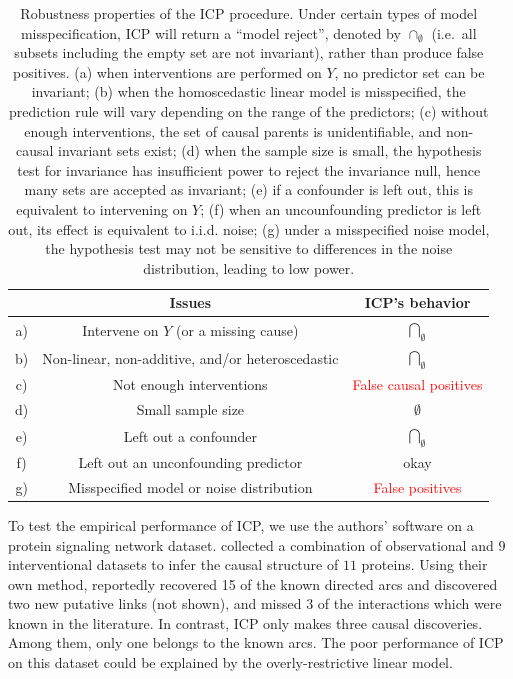 \documentclass{article}
\begin{document}
\begin{table}[h]
\centering
  \begin{tabular}{c|c|c|}
    \hline
    &\textbf{Issues} & \textbf{ICP's behavior} \\
    \hline
    a) & Intervene on $Y$ (or a missing cause) &
    $\underset{\emptyset}{\bigcap}$ \\
    \hline
    b) & Non-linear, non-additive, and/or heteroscedastic &
    $\underset{\emptyset}{\bigcap}$ \\
    \hline
    c) & Not enough interventions &
    \textcolor{red}{False causal positives} \\
    \hline
    d) & Small sample size &
    $\emptyset$ \\
    \hline
    e) & Left out a confounder & $\underset{\emptyset}{\bigcap}$ \\
    \hline
    f) & Left out an unconfounding predictor & okay  \\
    \hline
    g) & Misspecified model or noise distribution & \textcolor{red}{False positives}\\\hline
  \end{tabular}
\caption{\small Robustness properties of the ICP procedure.  Under certain types
  of model misspecification, ICP will return a ``model reject'',
  denoted by $\cap_{\emptyset}$ (i.e.\ all subsets including the empty
  set are not invariant), rather than produce false positives.
(a) when interventions are performed on $Y$, no predictor set can be invariant;
(b) when the homoscedastic linear model is misspecified, the prediction rule
will vary depending on the range of the predictors; (c) without enough interventions,
the set of causal parents is unidentifiable, and non-causal invariant sets exist;
(d) when the sample size is small, the hypothesis test for invariance has insufficient power to reject the invariance null,
hence many sets are accepted as invariant;
(e) if a confounder is left out, this is equivalent to intervening on $Y$;
(f) when an uncounfounding predictor is left out, its effect is equivalent to i.i.d. noise;
(g) under a misspecified noise model, the hypothesis test may not be sensitive to differences in the noise distribution,
leading to low power.
}
\label{tab:icp}
\end{table}

To test the empirical performance of ICP, we use the authors' software
on a protein signaling network dataset. \citet{sachs2005causal}
collected a combination of observational and $9$ interventional datasets to
infer the causal structure of $11$ proteins.
Using their own method, \citet{sachs2005causal} reportedly recovered
15 of the known directed arcs and discovered two new putative links
(not shown), and missed 3 of the interactions which were known in the
literature. In contrast, ICP only makes three causal
discoveries. Among them, only one belongs to the known arcs.
The poor performance of ICP on this dataset could be explained by the
overly-restrictive linear model.
\end{document}
